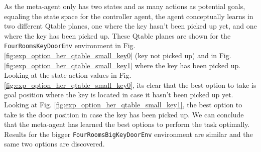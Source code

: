 \documentclass[conference]{IEEEtran}
\begin{document}
As the meta-agent only has two states and as many actions as potential goals, equaling the state space for the controller agent, the agent conceptually learns in two different Qtable planes, one where the key hasn't been picked up yet, and one where the key has been picked up. These Qtable planes are shown for the \texttt{FourRoomsKeyDoorEnv} environment in Fig. \ref{fig:exp_option_her_qtable_small_key0} (key not picked up) and in Fig. \ref{fig:exp_option_her_qtable_small_key1} where the key has been picked up. Looking at the state-action values in Fig. \ref{fig:exp_option_her_qtable_small_key0}, its clear that the best option to take is goal position where the key is located in case it hasn't been picked up yet. Looking at Fig. \ref{fig:exp_option_her_qtable_small_key1}, the best option to take is the door position in case the key has been picked up. We can conclude that the meta-agent has learned the best options to perform the task optimally. Results for the bigger \texttt{FourRoomsBigKeyDoorEnv} environment are similar and the same two options are discovered.
\end{document}
